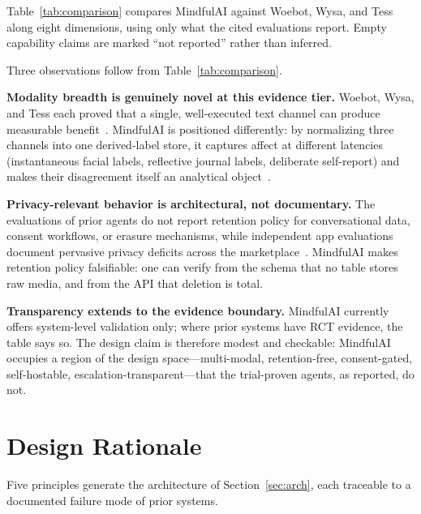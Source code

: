\documentclass[11pt,a4paper]{article}
\newcommand{\system}{MindfulAI}
\begin{document}
Table~\ref{tab:comparison} compares \system{} against Woebot, Wysa, and Tess along eight dimensions, using only what the cited evaluations report. Empty capability claims are marked ``not reported'' rather than inferred.

Three observations follow from Table~\ref{tab:comparison}.

\textbf{Modality breadth is genuinely novel at this evidence tier.} Woebot, Wysa, and Tess each proved that a single, well-executed text channel can produce measurable benefit~\cite{fitzpatrick2017,inkster2018,fulmer2018}. \system{} is positioned differently: by normalizing three channels into one derived-label store, it captures affect at different latencies (instantaneous facial labels, reflective journal labels, deliberate self-report) and makes their disagreement itself an analytical object~\cite{poria2017}.

\textbf{Privacy-relevant behavior is architectural, not documentary.} The evaluations of prior agents do not report retention policy for conversational data, consent workflows, or erasure mechanisms, while independent app evaluations document pervasive privacy deficits across the marketplace~\cite{lagan2020}. \system{} makes retention policy falsifiable: one can verify from the schema that no table stores raw media, and from the API that deletion is total.

\textbf{Transparency extends to the evidence boundary.} \system{} currently offers system-level validation only; where prior systems have RCT evidence, the table says so. The design claim is therefore modest and checkable: \system{} occupies a region of the design space---multi-modal, retention-free, consent-gated, self-hostable, escalation-transparent---that the trial-proven agents, as reported, do not.

\FloatBarrier

\section{Design Rationale}\label{sec:rationale}

Five principles generate the architecture of Section~\ref{sec:arch}, each traceable to a documented failure mode of prior systems.
\end{document}
